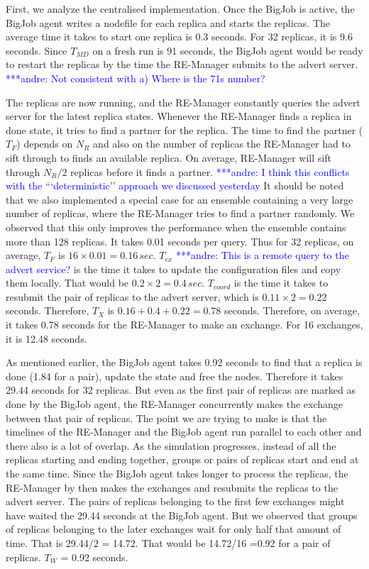 \documentclass{rspublic}
\newcommand{\alnote}[1]{ {\textcolor{blue} { ***andre: #1 }}}
\newcommand{\alnote}[1]{}
\begin{document}
First, we analyze the centralised implementation.  Once the BigJob is active, 
the BigJob agent writes a nodefile for
each replica and starts the replicas. The average time it takes to
start one replica is 0.3 seconds. For 32 replicas, it is 9.6
seconds. Since $T_{MD}$ on a fresh run is 91 seconds, the BigJob agent
would be ready to restart the replicas by the time the RE-Manager
submits to the advert server. \alnote{Not consistent with a) 
Where is the 71s number?}

The replicas are now running, and the RE-Manager constantly
queries the advert server for the latest replica states. Whenever the
RE-Manager finds a replica in done state, it tries to find a partner
for the replica. The time to find the partner ($T_F$)
depends on $N_R$ and also on the number of replicas the RE-Manager had
to sift through to finds an available replica. On average, RE-Manager
will sift through $N_R/2$ replicas before it finds a partner. \alnote{I think
this conflicts with the ```deterministic'' approach we discussed yesterday} It
should be noted that we also implemented a special case for an ensemble 
containing a very large number of replicas, where the RE-Manager tries to find a
partner randomly. We observed that this only improves the performance
when the ensemble contains more than 128 replicas. It takes 0.01
seconds per query. Thus for 32 replicas, on average, $T_F$ is
$16\times 0.01=0.16\,sec$. 
$T_{ex}$ \alnote{This is a remote query to the advert service?}  is the time it takes to update
the configuration files and copy them locally. That would be
$0.2\times 2=0.4\,sec.$ $T_{coord}$ is the time it takes to
resubmit the pair of replicas to the advert server, which is
$0.11\times 2 = 0.22$ seconds. Therefore, $T_X$ is
$0.16+0.4+0.22=0.78$ seconds. Therefore, on average, it takes 0.78
seconds for the RE-Manager to make an exchange. For 16 exchanges, it
is 12.48 seconds.

As mentioned earlier, the BigJob agent takes 0.92 seconds to find that
a replica is done (1.84 for a pair), update the state and free the
nodes. Therefore it takes 29.44 seconds for 32 replicas. But even as
the first pair of replicas are marked as done by the BigJob agent, the
RE-Manager concurrently makes the exchange between that pair of
replicas. The point we are trying to make is that the timelines of the
RE-Manager and the BigJob agent run parallel to each other and there
also is a lot of overlap.  As the simulation progresses, instead of
all the replicas starting and ending together, groups or pairs of
replicas start and end at the same time.  Since the BigJob agent takes
longer to process the replicas, the RE-Manager by then makes the
exchanges and resubmits the replicas to the advert server. The pairs
of replicas belonging to the first few exchanges might have waited the
29.44 seconds at the BigJob agent. But we observed that groups of
replicas belonging to the later exchanges wait for only half that
amount of time. That is 29.44/2 = 14.72. That would be 14.72/16 =0.92
for a pair of replicas. $T_W$ = 0.92 seconds.
\end{document}
